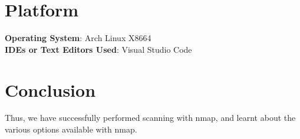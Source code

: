 \documentclass[11pt]{article}
\begin{document}
\section{Platform}
\textbf{Operating System}: Arch Linux X8664 \\
\textbf{IDEs or Text Editors Used}: Visual Studio Code\\

% 

\section{Conclusion}
Thus, we have successfully performed scanning with nmap, and learnt about the various options available with nmap.

\clearpage

\pagebreak
\end{document}
